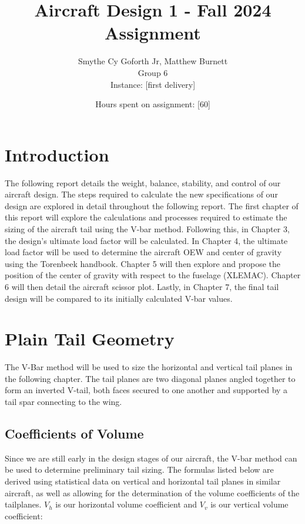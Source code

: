 \documentclass[12pt]{report}
\title{Aircraft Design 1 - Fall 2024 \\ Assignment }
\author{Smythe Cy Goforth Jr, Matthew Burnett \\ Group 6 \\ Instance: [first delivery]}
\date{Hours spent on assignment: [60]}
\begin{document}
	
	\maketitle
	\newpage

	\chapter{Introduction}
	
	The following report details the weight, balance, stability, and control of our aircraft design. The steps required to calculate the new specifications of our design are explored in detail throughout the following report. The first chapter of this report will explore the calculations and processes required to estimate the sizing of the aircraft tail using the V-bar method. Following this, in Chapter 3, the design's ultimate load factor will be calculated. In Chapter 4, the ultimate load factor will be used to determine the aircraft OEW and center of gravity using the Torenbeek handbook. Chapter 5 will then explore and propose the position of the center of gravity with respect to the fuselage (XLEMAC). Chapter 6 will then detail the aircraft scissor plot. Lastly, in Chapter 7, the final tail design will be compared to its initially calculated V-bar values.
	
	\chapter{Plain Tail Geometry}
	
	The V-Bar method will be used to size the horizontal and vertical tail planes in the following chapter. The tail planes are two diagonal planes angled together to form an inverted V-tail, both faces secured to one another and supported by a tail spar connecting to the wing.  
	
	\section{Coefficients of Volume}
	
	Since we are still early in the design stages of our aircraft, the V-bar method can be used to determine preliminary tail sizing. The formulas listed below are derived using statistical data on vertical and horizontal tail planes in similar aircraft, as well as allowing for the determination of the volume coefficients of the tailplanes. $V_h$ is our horizontal volume coefficient and $V_v$ is our vertical volume coefficient:
	
\end{document}
